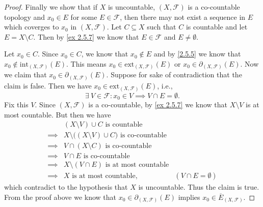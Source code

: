 \begin{proof}
  Finally we show that if \(X\) is uncountable, \((X, \mathcal{F})\) is a co-countable topology and \(x_0 \in E\) for some \(E \in \mathcal{F}\), then there may not exist a sequence in \(E\) which coverges to \(x_0\) in \((X, \mathcal{F})\).
  Let \(C \subseteq X\) such that \(C\) is countable and let \(E = X \setminus C\).
  Then by \cref{ex 2.5.7} we know that \(E \in \mathcal{F}\) and \(E \neq \emptyset\).

  Let \(x_0 \in C\).
  Since \(x_0 \in C\), we know that \(x_0 \notin E\) and by \cref{2.5.5} we know that \(x_0 \notin \text{int}_{(X, \mathcal{F})}(E)\).
  This means \(x_0 \in \text{ext}_{(X, \mathcal{F})}(E)\) or \(x_0 \in \partial_{(X, \mathcal{F})}(E)\).
  Now we claim that \(x_0 \in \partial_{(X, \mathcal{F})}(E)\).
  Suppose for sake of contradiction that the claim is false.
  Then we have \(x_0 \in \text{ext}_{(X, \mathcal{F})}(E)\), i.e.,
  \[
    \exists\ V \in \mathcal{F} : x_0 \in V \implies V \cap E = \emptyset.
  \]
  Fix this \(V\).
  Since \((X, \mathcal{F})\) is a co-countable, by \cref{ex 2.5.7} we know that \(X \setminus V\) is at most countable.
  But then we have
  \begin{align*}
             & (X \setminus V) \cup C \text{ is countable}                                                   \\
    \implies & X \setminus \big((X \setminus V) \cup C\big) \text{ is co-countable}                          \\
    \implies & V \cap (X \setminus C) \text{ is co-countable}                                                \\
    \implies & V \cap E \text{ is co-countable}                                                              \\
    \implies & X \setminus (V \cap E) \text{ is at most countable}                                           \\
    \implies & X \text{ is at most countable},                                      & (V \cap E = \emptyset)
  \end{align*}
  which contradict to the hypothesis that \(X\) is uncountable.
  Thus the claim is true.
  From the proof above we know that \(x_0 \in \partial_{(X, \mathcal{F})}(E)\) implies \(x_0 \in \overline{E}_{(X, \mathcal{F})}\).


\end{proof}
